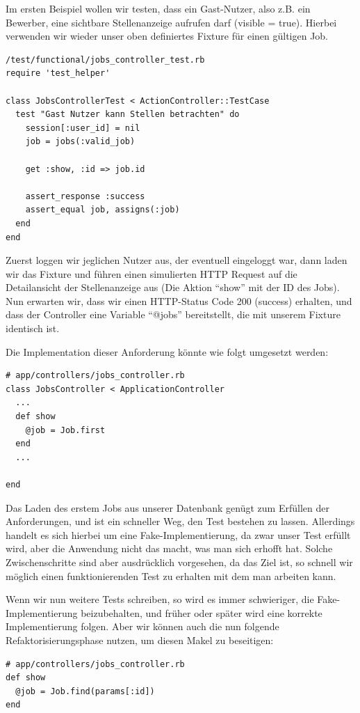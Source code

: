 Im ersten Beispiel wollen wir testen, dass ein Gast-Nutzer, also z.B. ein Bewerber, eine sichtbare Stellenanzeige aufrufen darf (visible = true). Hierbei verwenden wir wieder unser oben definiertes Fixture für einen gültigen Job.
\begin{lstlisting}
/test/functional/jobs_controller_test.rb 
require 'test_helper'

class JobsControllerTest < ActionController::TestCase
  test "Gast Nutzer kann Stellen betrachten" do
    session[:user_id] = nil
    job = jobs(:valid_job)
    
    get :show, :id => job.id
    
    assert_response :success
    assert_equal job, assigns(:job)
  end
end
\end{lstlisting}
Zuerst loggen wir jeglichen Nutzer aus, der eventuell eingeloggt war, dann laden wir das Fixture und führen einen simulierten HTTP Request auf die Detailansicht der Stellenanzeige aus (Die Aktion "`show"' mit der ID des Jobs).
Nun erwarten wir, dass wir einen HTTP-Status Code 200 (success) erhalten, und dass der Controller eine Variable "`@jobs"' bereitstellt, die mit unserem Fixture identisch ist.

Die Implementation dieser Anforderung könnte wie folgt umgesetzt werden:
\begin{lstlisting}
# app/controllers/jobs_controller.rb
class JobsController < ApplicationController
  ...
  def show
    @job = Job.first
  end
  ...
  
end
\end{lstlisting}
Das Laden des erstem Jobs aus unserer Datenbank genügt zum Erfüllen der Anforderungen, und ist ein schneller Weg, den Test bestehen zu lassen. Allerdings handelt es sich hierbei um eine Fake-Implementierung, da zwar unser Test erfüllt wird, aber die Anwendung nicht das macht, was man sich erhofft hat. Solche Zwischenschritte sind aber ausdrücklich vorgesehen, da das Ziel ist, so schnell wir möglich einen funktionierenden Test zu erhalten mit dem man arbeiten kann.

Wenn wir nun weitere Tests schreiben, so wird es immer schwieriger, die Fake-Implementierung beizubehalten, und früher oder später wird eine korrekte Implementierung folgen. 
Aber wir können auch die nun folgende Refaktorisierungsphase nutzen, um diesen Makel zu beseitigen:
\begin{lstlisting}
# app/controllers/jobs_controller.rb
def show
  @job = Job.find(params[:id])
end
\end{lstlisting}

